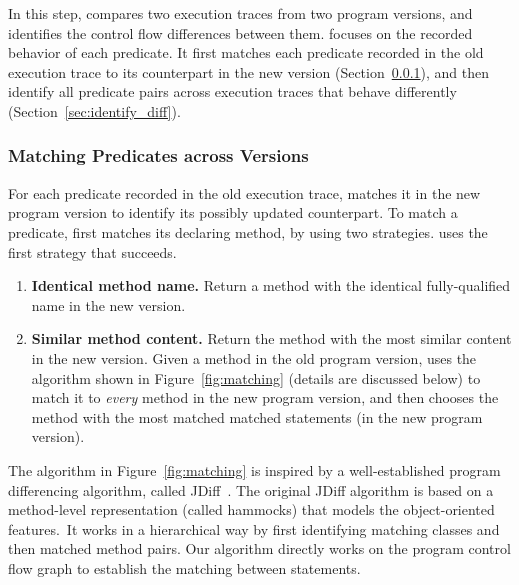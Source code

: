 

In this step, \ourtool compares two execution traces
from two program versions, and identifies the
control flow differences between them. \ourtool focuses on the
recorded behavior of each predicate. It first 
matches each predicate recorded in the old
execution trace to its counterpart in the new version
(Section~\ref{sec:match_predicate}),
and then identify all predicate pairs across execution traces that
behave differently (Section~\ref{sec:identify_diff}).


\subsubsection{Matching Predicates across Versions}
\label{sec:match_predicate}

For each predicate recorded in the old execution trace,
\ourtool matches it in the new program version to identify
its possibly updated counterpart.
To match a predicate, \ourtool first matches its declaring method,
by using two strategies. \ourtool uses
the first strategy that succeeds.



\begin{enumerate}
\item \textbf{Identical method name.} Return a method with the identical
fully-qualified name in the new version.
\item \textbf{Similar method content.} Return the method with
the most similar content in the new version. Given
a method in the old program version, \ourtool
uses the algorithm shown in Figure~\ref{fig:matching}
(details are discussed below) to match it
to \textit{every} method in the new program version, and then
chooses the method with the most matched matched statements
(in the new program version).
\end{enumerate}

The algorithm in Figure~\ref{fig:matching} is inspired by
a well-established program differencing algorithm, called
JDiff~\cite{Apiwattanapong:2004}. The original JDiff
algorithm is based on a method-level representation
(called hammocks) that models the object-oriented features.\
It works in a hierarchical way by first identifying matching
classes and then matched method pairs. Our
algorithm directly works on the program control flow graph
to establish the matching between statements.

